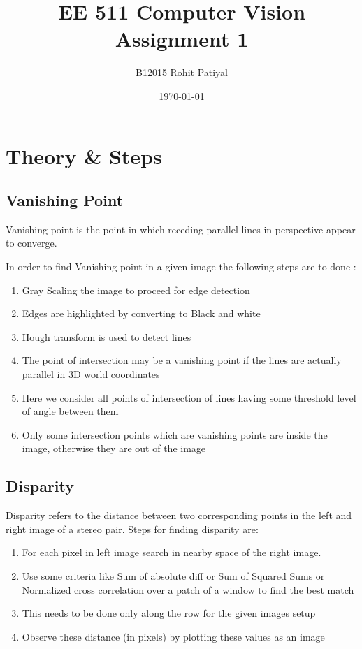 \documentclass[12pt]{article}
\begin{document}

\title{EE 511 Computer Vision Assignment 1}
\author{B12015 Rohit Patiyal}
\date{\today}

\maketitle
\section*{Theory \& Steps}
	\subsection*{Vanishing Point}
 Vanishing point is the point in which receding parallel lines in perspective appear to converge.

	In order to find Vanishing point in a given image the following steps are to done :
    \begin{enumerate}
		\item{Gray Scaling the image to proceed for edge detection}
        \item{Edges are highlighted by converting to Black and white}
        \item{Hough transform is used to detect lines}
        \item{The point of intersection may be a vanishing point if the lines are actually parallel in 3D world coordinates}
        \item{Here we consider all points of intersection of lines having some threshold level of angle between them}
        \item{Only some intersection points which are vanishing points are inside the image, otherwise they are out of the image}
	\end{enumerate}
    
    \pagebreak
    
    \subsection*{Disparity}
		Disparity refers to the distance between two corresponding points in the left and right image of a stereo pair. 
        Steps for finding disparity are:
        \begin{enumerate}
		\item{For each pixel in left image search in nearby space of the right image.}
        \item{Use some criteria like Sum of absolute diff or Sum of Squared Sums or Normalized cross correlation over a patch of a window to find the best match}
        \item{This needs to be done only along the row for the given images setup}
        \item{Observe these distance (in pixels) by plotting these values as an image}
	\end{enumerate}
    
\end{document}
